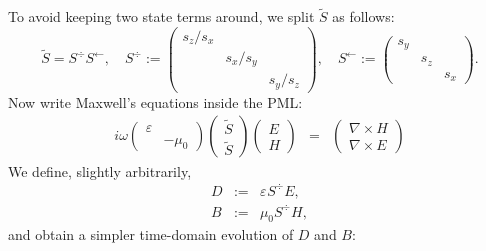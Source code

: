 To avoid keeping two state terms around, we split $\tilde{S}$ as follows:
\[ \tilde{S} = S^{\div} S^{\leftarrow}, \quad S^{\div} :=
   \left(\begin{array}{ccc}
     s_z / s_x &  & \\
     & s_x / s_y & \\
     &  & s_y / s_z
   \end{array}\right), \quad S^{\leftarrow} := \left(\begin{array}{ccc}
     s_y &  & \\
     & s_z & \\
     &  & s_x
   \end{array}\right) . \]
Now write Maxwell's equations inside the PML:
\begin{eqnarray*}
  i \omega \left(\begin{array}{cc}
    \varepsilon & \\
    & - \mu_0
  \end{array}\right) \left(\begin{array}{c}
    \tilde{S}\\
    \tilde{S}
  \end{array}\right) \left(\begin{array}{c}
    E\\
    H
  \end{array}\right) & = & \left(\begin{array}{c}
    \nabla \times H\\
    \nabla \times E
  \end{array}\right)
\end{eqnarray*}
We define, slightly arbitrarily,
\begin{eqnarray*}
  D & := & \varepsilon_{} S^{\div} E,\\
  B & := & \mu_0 S^{\div} H,
\end{eqnarray*}
and obtain a simpler time-domain evolution of $D$ and $B$:
